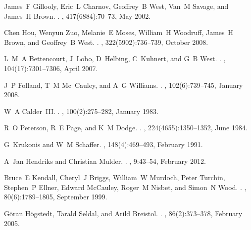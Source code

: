 \documentclass[twocolumn,preprintnumbers,amsmath,amssymb,superscriptaddress]{revtex4}
\begin{document}
\begin{bibunit}[unsrt]
\begin{thebibliography}{10}
James~F Gillooly, Eric~L Charnov, Geoffrey~B West, Van~M Savage, and James~H
  Brown.
.
, 417(6884):70--73, May 2002.

Chen Hou, Wenyun Zuo, Melanie~E Moses, William~H Woodruff, James~H Brown, and
  Geoffrey~B West.
.
, 322(5902):736--739, October 2008.

L~M~A Bettencourt, J~Lobo, D~Helbing, C~Kuhnert, and G~B West.
.
, 104(17):7301--7306, April 2007.

J~P Folland, T~M Mc~Cauley, and A~G Williams.
.
, 102(6):739--745, January 2008.

W~A Calder~III.
.
, 100(2):275--282, January 1983.

R~O Peterson, R~E Page, and K~M Dodge.
.
, 224(4655):1350--1352, June 1984.

G~Krukonis and W~M Schaffer.
, 148(4):469--493, February 1991.

A~Jan Hendriks and Christian Mulder.
.
, 9:43--54, February 2012.

Bruce~E Kendall, Cheryl~J Briggs, William~W Murdoch, Peter Turchin, Stephen~P
  Ellner, Edward McCauley, Roger~M Nisbet, and Simon~N Wood.
.
, 80(6):1789--1805, September 1999.

G{\"o}ran H{\"o}gstedt, Tarald Seldal, and Arild Breistol.
.
, 86(2):373--378, February 2005.


\end{thebibliography}
\end{bibunit}
\end{document}
